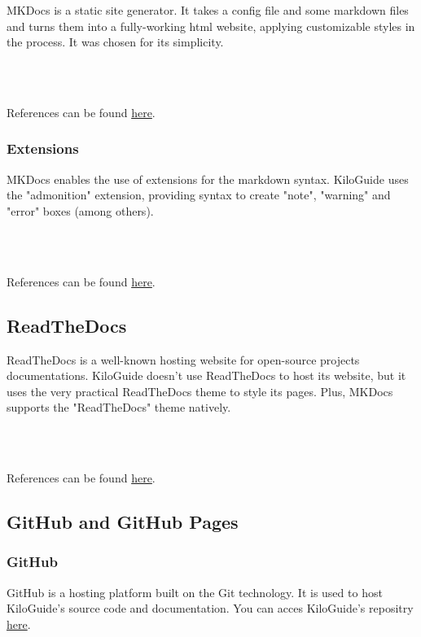 \documentclass[a4paper,12pt,titlepage]{scrartcl}
\begin{document}
MKDocs is a static site generator. It takes a config file and some markdown files and turns them into a fully-working html website, applying customizable styles in the process. It was chosen for its simplicity.

\\\

References can be found \href{https://www.mkdocs.org}{here}. 

\subsubsection{Extensions}

MKDocs enables the use of extensions for the markdown syntax. KiloGuide uses the "admonition" extension, providing syntax to create "note", "warning" and "error" boxes (among others).

\\\

References can be found \href{https://python-markdown.github.io/extensions/admonition/}{here}.

\subsection{ReadTheDocs}

ReadTheDocs is a well-known hosting website for open-source projects documentations. KiloGuide doesn't use ReadTheDocs to host its website, but it uses the very practical ReadTheDocs theme to style its pages. Plus, MKDocs supports the "ReadTheDocs" theme natively.

\\\

References can be found \href{https://readthedocs.org}{here}.

\subsection{GitHub and GitHub Pages}

\subsubsection{GitHub}

GitHub is a hosting platform built on the Git technology. It is used to host KiloGuide's source code and documentation. You can acces KiloGuide's repositry \href{https://github.com/SimLej18/KiloGuide}{here}.

\\\
\end{document}
